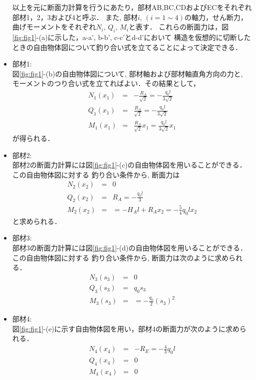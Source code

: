 \documentclass[10pt,a4j]{jarticle}
\begin{document}
\begin{itemize}
	以上を元に断面力計算を行うにあたり，部材AB,BC,CDおよびECをそれぞれ部材1，2，3および4と呼ぶ．
	また, 部材$i,\,(i=1\sim 4)$の軸力，せん断力，曲げモーメントをそれぞれ$N_i, \, Q_i,\, M_i$と表す．
	これらの断面力は，図\ref{fig:fig1}-(a)に示した，a-a', b-b', c-c'とd-d'において
	構造を仮想的に切断したときの自由物体図について釣り合い式を立てることによって決定できる．
\item
	{\rm 部材1:} \\
	図\ref{fig:fig1}-(b)の自由物体図について, 部材軸および部材軸直角方向の力と, 
	モーメントのつり合い式を立てればよい．その結果として，
	\begin{eqnarray}
		N_1(x_1) & =& -\frac{R_A}{\sqrt{2}}=-\frac{q_0l}{3\sqrt{2}} \\
		Q_1(x_1) & =& \frac{R_A}{\sqrt{2}}=-\frac{q_0l}{3\sqrt{2}} \\
		M_1(x_1) & =& \frac{R_A}{\sqrt{2}}x_1 =\frac{q_0l}{3\sqrt{2}}x_1
	\end{eqnarray}
	が得られる．
\item
	{\rm 部材2:} \\
	部材2の断面力計算には図\ref{fig:fig1}-(c)の自由物体図を用いることができる．この自由物体図に対する
	釣り合い条件から, 断面力は
	\begin{eqnarray}
		N_2(x_2) 
			&=& 0\\
		Q_2(x_2) 
			&=&
			R_A= -\frac{q_0l}{3} \\
		M_2(x_2) 
			&=&
			=-H_Al+R_Ax_2
			=-\frac{5}{4}q_0lx_2
	\end{eqnarray}
	と求められる．
\item
	{\rm 部材3:} \\
	部材3の断面力計算には図\ref{fig:fig1}-(d)の自由物体図を用いることができる．この自由物体図に対する
	釣り合い条件から, 断面力は次のように求められる．
	\begin{eqnarray}
		N_3(s_3) 
			&=&  0 \\
		Q_3(s_3) 
			&=&
			q_0s_3 \\
		M_3(s_3) 
			&=&
			=-\frac{q_0}{2}(s_3)^2
	\end{eqnarray}
\item
	{\rm 部材4:} \\
	図\ref{fig:fig1}-(e)に示す自由物体図を用い，部材4の断面力が次のように求められる．
	\begin{eqnarray}
		N_4(x_4) 
			&=&  -R_E=-\frac{4}{3}q_0l \\
		Q_4(x_4) 
			&=&  0 \\
		M_4(x_4) 
			&=&  0 
	\end{eqnarray}
\end{itemize}
\end{document}
